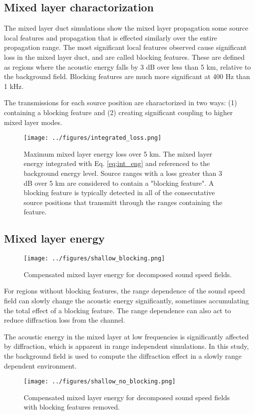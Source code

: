 \documentclass[preprint,NumberedRefs]{JASA}
\begin{document}
\subsection{Mixed layer charactorization}
The mixed layer duct simulations show the mixed layer propagation some source local features and propagation that is effected similarly over the entire propagation range. The most significant local features observed cause significant loss in the mixed layer duct, and are called blocking features. These are defined as regions where the acoustic energy falls by 3 dB over less than 5 km, relative to the background field. Blocking features are much more significant at 400 Hz than 1 kHz.

The transmissions for each source position are charactorized in two ways: (1) containing a blocking feature and (2) creating significant coupling to higher mixed layer modes.
\begin{figure}
\texttt{[image: ../figures/integrated\_loss.png]}
    \caption{Maximum mixed layer energy loss over 5 km. The mixed layer energy integrated with Eq. \eqref{eq:int_eng} and referenced to the background energy level. Source ranges with a loss greater than 3 dB over 5 km are considered to contain a "blocking feature". A blocking feature is typically detected in all of the consecutative source positions that transmitt through the ranges containing the feature.}
    \label{fig:blocking}
\end{figure}

\subsection{Mixed layer energy}
\begin{figure}
\texttt{[image: ../figures/shallow\_blocking.png]}
    \caption{Compensated mixed layer energy for decomposed sound speed fields.}
    \label{fig:shal_block}
\end{figure}

For regions without blocking features, the range dependence of the sound speed field can slowly change the acoustic energy significantly, sometimes accumulating the total effect of a blocking feature. The range dependence can also act to reduce diffraction loss from the channel.

The acoustic energy in the mixed layer at low frequencies is significantly affected by diffraction, which is apparent in range independent simulations. In this study, the background field is used to compute the diffraction effect in a slowly range dependent environment.

\begin{figure}
\texttt{[image: ../figures/shallow\_no\_blocking.png]}
    \caption{Compensated mixed layer energy for decomposed sound speed fields with blocking features removed.}
    \label{fig:shal_no_block}
\end{figure}




\end{document}
